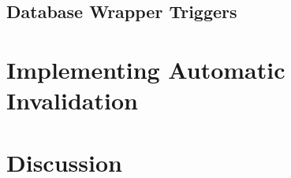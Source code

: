 

\subsection{Database Wrapper Triggers}
\label{subsec:database-wrapper-triggers}



\section{Implementing Automatic Invalidation}
\label{sec:implementing-automatic-invalidation}



\section{Discussion}
\label{sec:invalidation-discussion}




